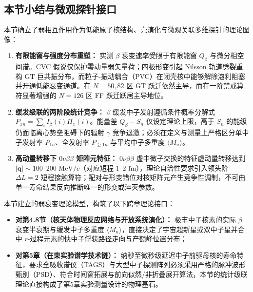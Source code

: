 \subsection{本节小结与微观探针接口}\label{sec:4-7-4}

本节确立了弱相互作用作为低能原子核结构、壳演化与微观关联多维探针的理论图像：
\begin{enumerate}
\item \textbf{有限能窗与强度分布重塑：} 实测 $\beta$ 衰变速率受限于有限能窗 $Q_\beta$ 与微分相空间谱。CVC 假说仅保护零动量弱矢量荷；四极形变引起 Nilsson 轨道劈裂重构 GT 巨共振分布，而粒子-振动耦合（PVC）在闭壳核中能够解除泡利阻塞并开通低能衰变通道。在 $N=50, 82$ 区 GT 跃迁依然主导，而在一阶禁戒算符显著增强的 $N=126$ 区 FF 跃迁跃居主导地位。
\item \textbf{缓发级联的两阶段统计竞争：} $\beta$ 缓发中子发射遵循条件概率分解式 $P_{xn} = \sum_i I_\beta(i) \Pi_x(i)$。能量差 $Q_\beta - S_n$ 仅设定理论上限，高于 $S_n$ 的能级仍面临离心势垒阻碍下的辐射 $\gamma$ 竞争退激；必须在定义与测量上严格区分单中子发射率 $P_{1n}$、全发射率 $P_{\ge 1n}$ 与平均中子多重度 $\langle M_n \rangle$。
\item \textbf{高动量转移下 $0\nu\beta\beta$ 矩阵元特征：} $0\nu\beta\beta$ 虚中微子交换的特征虚动量转移达到 $|\mathbf{q}| \sim 100\text{--}200\text{ MeV}/c$（对应短程 $1\text{--}2\text{ fm}$），理论自洽性要求引入领头阶 $\Delta L = 2$ 短程接触算符；配对与形变错位对核矩阵元产生竞争性调制，不可由单一寿命结果反向推断唯一的形变或淬灭参数。
\end{enumerate}

本节建立的弱衰变理论模型，构筑了以下跨章理论接口：
\begin{itemize}
\item \textbf{对第4.8节（核天体物理反应网络与开放系统演化）：} 极丰中子核素的实际 $\beta$ 衰变半衰期与缓发中子多重度 $\langle M_n \rangle$，直接决定了宇宙超新星或双中子星并合中 $r$-过程元素的快中子俘获路径走向与产额峰位置分布；
\item \textbf{对第5章（在束实验谱学技术链）：} 纳秒至微秒级延迟中子前驱母核的寿命特征，要求全吸收谱仪（TAGS）与大型中子探测阵列必须采用严格的脉冲波形甄别（PSD）、符合时间窗拓展与前向似然/非折叠展开算法，本节的统计级联理论直接构成了第5章实验测量设计的物理基石。
\end{itemize}
